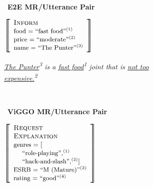\begin{figure}

{

    \begin{subfigure}{0.5\textwidth}
        \caption{\large~\textbf{E2E MR/Utterance Pair}}
    \end{subfigure}


    \centering
    \begin{subfigure}{0.25\textwidth}
         $\MR{\begin{array}{l}  
            \DA{Inform} \\
            \textrm{\footnotesize food = ``fast food''\textsuperscript{(1)}} \\
            \textrm{\footnotesize price = ``moderate''\textsuperscript{(2)}} \\
            \textrm{\footnotesize name = ``The Punter''\textsuperscript{(3)}}\\
        \end{array}}$
    \end{subfigure}\hfill\begin{subfigure}{0.19\textwidth}
        \textit{\ul{The Punter}\textsuperscript{3} is a 
            \ul{fast food}\textsuperscript{1} joint that is 
            \ul{not too expensive.}\textsuperscript{2}}
    \end{subfigure}
}

~\\



{
    \begin{subfigure}{0.5\textwidth}
        \caption{\large~\textbf{ViGGO MR/Utterance Pair}}
        \label{fig:exviggo}
    \end{subfigure}

    \centering
    \begin{subfigure}{0.25\textwidth}
        $\MR{\begin{array}{l}  
            \DA{Request} \\ 
            \DA{Explanation} \\
            \textrm{\footnotesize genres = [}\\
            \textrm{\footnotesize~~~~``role-playing'',\textsuperscript{(1)}} \\
            \textrm{\footnotesize~~~~``hack-and-slash'',\textsuperscript{(2)}]} \\
            \textrm{\footnotesize ESRB = ``M (Mature)''\textsuperscript{(3)}}\\
            \textrm{\footnotesize rating = ``good''\textsuperscript{(4)}} \\ 
        \end{array}}$


\end{subfigure}}
\end{figure}

